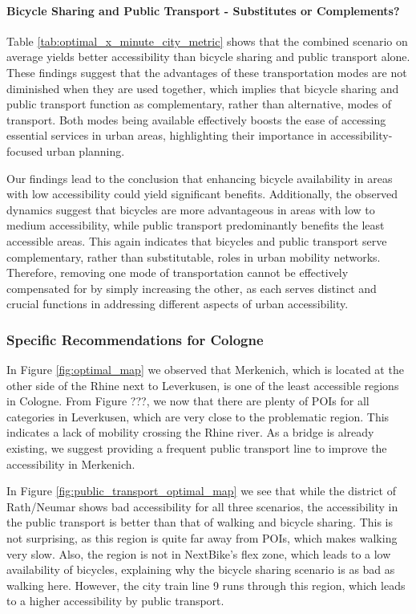 \paragraph{Bicycle Sharing and Public Transport - Substitutes or Complements?}

Table \ref{tab:optimal_x_minute_city_metric} shows that the combined scenario on average yields better accessibility than bicycle sharing and public transport alone.
These findings suggest that the advantages of these transportation modes are not diminished when they are used together, which implies that bicycle sharing and public transport function as complementary, rather than alternative, modes of transport.
Both modes being available effectively boosts the ease of accessing essential services in urban areas, highlighting their importance in accessibility-focused urban planning.



Our findings lead to the conclusion that enhancing bicycle availability in areas with low accessibility could yield significant benefits.
Additionally, the observed dynamics suggest that bicycles are more advantageous in areas with low to medium accessibility, while public transport predominantly benefits the least accessible areas.
This again indicates that bicycles and public transport serve complementary, rather than substitutable, roles in urban mobility networks.
Therefore, removing one mode of transportation cannot be effectively compensated for by simply increasing the other, as each serves distinct and crucial functions in addressing different aspects of urban accessibility.


\subsubsection{Specific Recommendations for Cologne}

In Figure \ref{fig:optimal_map} we observed that Merkenich, which is located at the other side of the Rhine next to Leverkusen, is one of the least accessible regions in Cologne.
From Figure ???, we now that there are plenty of POIs for all categories in Leverkusen, which are very close to the problematic region.
This indicates a lack of mobility crossing the Rhine river.
As a bridge is already existing, we suggest providing a frequent public transport line to improve the accessibility in Merkenich.



In Figure \ref{fig:public_transport_optimal_map} we see that while the district of Rath/Neumar shows bad accessibility for all three scenarios, the accessibility in the public transport is better than that of walking and bicycle sharing.
This is not surprising, as this region is quite far away from POIs, which makes walking very slow.
Also, the region is not in NextBike's flex zone, which leads to a low availability of bicycles, explaining why the bicycle sharing scenario is as bad as walking here.
However, the city train line 9 runs through this region, which leads to a higher accessibility by public transport.


